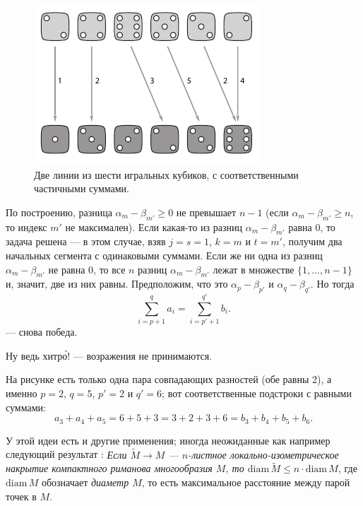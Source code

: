 \begin{figure}[ht!]
\centering
\includegraphics[scale=1]{pics/kubiki}
\caption{Две линии из шести игральных кубиков, с соответственными частичными суммами.}
\label{pic:kubiki}
\end{figure}

По построению, разница $\alpha_m-\beta_{m'}\ge 0$ не превышает $n-1$ 
(если $\alpha_m-\beta_{m'}\ge n$, то индекс $m'$ не максимален).
Если какая-то из разниц $\alpha_m-\beta_{m'}$ равна $0$, то задача решена --- в этом случае, взяв $j=s=1$, $k=m$ и $t=m'$, получим два начальных сегмента с одинаковыми суммами.
Если же ни одна из разниц $\alpha_m-\beta_{m'}$ не равна $0$, то все $n$ разниц 
$\alpha_m-\beta_{m'}$ лежат в множестве $\{1,\dots,n-1\}$ и, значит, две из них равны.
Предположим, что это $\alpha_p-\beta_{p'}$ и $\alpha_q-\beta_{q'}$.
Но тогда 
\[\sum_{i=p+1}^qa_i=\sum_{i=p'+1}^{q'}b_i.\]
--- снова победа.

Ну ведь хитр\'{о}! --- возражения не принимаются.

На рисунке есть только одна пара совпадающих разностей (обе равны 2), а именно $p=2$, $q=5$, $p'=2$ и $q'=6$;
вот соответственные подстроки с равными суммами:
\[a_3+a_4+a_5=6+5+3=3+2+3+6=b_3+b_4+b_5+b_6.\]

\begin{addedbytheeditors}
У этой идеи есть и другие применения; иногда неожиданные как например следующий результат \cite{petrunin}:
\textit{Если $\tilde M\to M$ --- $n$-листное локально-изометрическое накрытие компактного риманова многообразия $M$, то $\mathrm{diam}\, \tilde M\le n\cdot \mathrm{diam}\, M$}, где $\mathrm{diam}\, M$ обозначает \textit{диаметр $M$}, то есть максимальное расстояние между парой точек в $M$.
\end{addedbytheeditors}
